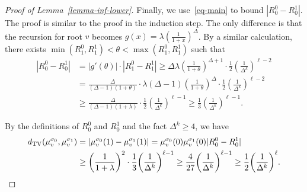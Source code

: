 \documentclass{theoretics}
\newcommand{\tp}[1]{{\left( #1 \right)}}
\newcommand{\abs}[1]{\ensuremath{\left\vert#1\right\vert}}
\newcommand{\dTV}{d_{\mathrm{TV}}}
\begin{document}
\begin{proof}[Proof of Lemma~\ref{lemma-inf-lower}]
Finally, we use~\eqref{eq-main} to bound $|R^0_0 - R^1_0|$. 
The proof is similar to the proof in the induction step.
The only difference is that the recursion for root $v$ becomes $g(x) = \lambda \tp{\frac{1}{1+x}}^{\Delta}$. By a similar calculation, there exists $\min(R^0_{1}, R^1_{1}) < \theta < \max(R^0_{1}, R^1_{1}) $ such that 
\begin{align*}
|R^0_0 - R^1_0| &= |g'(\theta)| \cdot  \abs{R^0_{1} - R^1_{1}}  \geq  \Delta \lambda \tp{\frac{1}{1+\theta}}^{\Delta+1} \cdot 	\frac{1}{2}\tp{\frac{1}{\Delta^k}}^{\ell-2}\\
&= \frac{\Delta}{(\Delta - 1)(1+\theta)} \cdot \lambda (\Delta-1) \tp{\frac{1}{1+\theta}}^{\Delta}  \cdot \frac{1}{2}\tp{\frac{1}{\Delta^k}}^{\ell-2}\\
&\geq  \frac{\Delta}{(\Delta - 1)(1+\lambda)} \cdot \frac{1}{2}\tp{\frac{1}{\Delta^k}}^{\ell-1}
 \geq \frac{1}{3}\tp{\frac{1}{\Delta^k}}^{\ell-1}.
\end{align*}

By the definitions of $R^0_0$ and $R^1_0$ and the fact $\Delta^k \geq 4$, we have
\begin{align*}
	\dTV\tp{ \mu^{\sigma_0}_v, \mu^{\sigma_1}_v } &= \abs{\mu^{\sigma_0}_v(1) - \mu^{\sigma_1}_v(1)} = \mu^{\sigma_0}_v(0)\mu^{\sigma_1}_v(0) |R^0_0 - R^1_0|\\
	&\geq \tp{\frac{1}{1+\lambda}}^2 \cdot \frac{1}{3}\tp{\frac{1}{\Delta^k}}^{\ell-1} 
  \geq \frac{4}{27}\tp{\frac{1}{\Delta^k}}^{\ell-1}
	\geq \frac{1}{2}\tp{\frac{1}{\Delta^k}}^{\ell}. \qedhere
\end{align*}
\end{proof}
\end{document}
